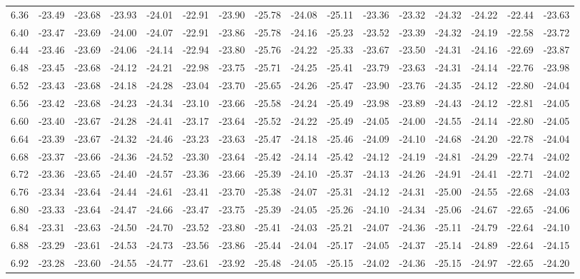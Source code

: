 \documentclass[floatfix,traditabstract,preprint2]{aa}
\begin{document}
\begin{table}
\begin{tabular}{c  c c c c c c c c c c c c c c c}
6.36 & -23.49 & -23.68 & -23.93 & -24.01 & -22.91 & -23.90 & -25.78 & -24.08 & -25.11 & -23.36 & -23.32 & -24.32 & -24.22 & -22.44 & -23.63\\
6.40 & -23.47 & -23.69 & -24.00 & -24.07 & -22.91 & -23.86 & -25.78 & -24.16 & -25.23 & -23.52 & -23.39 & -24.32 & -24.19 & -22.58 & -23.72\\
6.44 & -23.46 & -23.69 & -24.06 & -24.14 & -22.94 & -23.80 & -25.76 & -24.22 & -25.33 & -23.67 & -23.50 & -24.31 & -24.16 & -22.69 & -23.87\\
6.48 & -23.45 & -23.68 & -24.12 & -24.21 & -22.98 & -23.75 & -25.71 & -24.25 & -25.41 & -23.79 & -23.63 & -24.31 & -24.14 & -22.76 & -23.98\\
6.52 & -23.43 & -23.68 & -24.18 & -24.28 & -23.04 & -23.70 & -25.65 & -24.26 & -25.47 & -23.90 & -23.76 & -24.35 & -24.12 & -22.80 & -24.04\\
6.56 & -23.42 & -23.68 & -24.23 & -24.34 & -23.10 & -23.66 & -25.58 & -24.24 & -25.49 & -23.98 & -23.89 & -24.43 & -24.12 & -22.81 & -24.05\\
6.60 & -23.40 & -23.67 & -24.28 & -24.41 & -23.17 & -23.64 & -25.52 & -24.22 & -25.49 & -24.05 & -24.00 & -24.55 & -24.14 & -22.80 & -24.05\\
6.64 & -23.39 & -23.67 & -24.32 & -24.46 & -23.23 & -23.63 & -25.47 & -24.18 & -25.46 & -24.09 & -24.10 & -24.68 & -24.20 & -22.78 & -24.04\\
6.68 & -23.37 & -23.66 & -24.36 & -24.52 & -23.30 & -23.64 & -25.42 & -24.14 & -25.42 & -24.12 & -24.19 & -24.81 & -24.29 & -22.74 & -24.02\\
6.72 & -23.36 & -23.65 & -24.40 & -24.57 & -23.36 & -23.66 & -25.39 & -24.10 & -25.37 & -24.13 & -24.26 & -24.91 & -24.41 & -22.71 & -24.02\\
6.76 & -23.34 & -23.64 & -24.44 & -24.61 & -23.41 & -23.70 & -25.38 & -24.07 & -25.31 & -24.12 & -24.31 & -25.00 & -24.55 & -22.68 & -24.03\\
6.80 & -23.33 & -23.64 & -24.47 & -24.66 & -23.47 & -23.75 & -25.39 & -24.05 & -25.26 & -24.10 & -24.34 & -25.06 & -24.67 & -22.65 & -24.06\\
6.84 & -23.31 & -23.63 & -24.50 & -24.70 & -23.52 & -23.80 & -25.41 & -24.03 & -25.21 & -24.07 & -24.36 & -25.11 & -24.79 & -22.64 & -24.10\\
6.88 & -23.29 & -23.61 & -24.53 & -24.73 & -23.56 & -23.86 & -25.44 & -24.04 & -25.17 & -24.05 & -24.37 & -25.14 & -24.89 & -22.64 & -24.15\\
6.92 & -23.28 & -23.60 & -24.55 & -24.77 & -23.61 & -23.92 & -25.48 & -24.05 & -25.15 & -24.02 & -24.36 & -25.15 & -24.97 & -22.65 & -24.20\\

\end{tabular}
\end{table}
\end{document}
